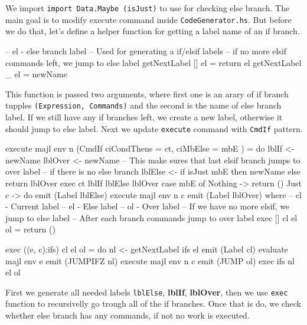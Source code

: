 \documentclass{article}
\begin{document}
\begin{flushleft}
We import \texttt{import Data.Maybe (isJust)} to use for checking else branch. The main goal is to modify execute command inside \texttt{CodeGenerator.hs}. But before we do that, let's define a helper function for getting a label name of an if branch.
\end{flushleft}
\begin{code}
-- el - else branch label
-- Used for generating a if/elsif labels
-- if no more elsif commands left, we jump to else label
getNextLabel [] el = return el
getNextLabel _  el = newName
\end{code}
\begin{flushleft}
This function is passed two arguments, where first one is an arary of if branch tupples \texttt{(Expression, Commands)} and the second is the name of else branch label. If we still have any if branches left, we create a new label, otherwise it should jump to else label. Next we update \texttt{execute} command with \texttt{CmdIf} pattern.
\end{flushleft}
\begin{code}
execute majl env n (CmdIf {ciCondThens = ct, ciMbElse = mbE }) = do
    lblIf <- newName
    lblOver <- newName
    -- This make sures that last elsif branch jumps to over label
    -- if there is no else branch
    lblElse <- if isJust mbE then newName else return lblOver
    exec ct lblIf lblElse lblOver
    case mbE of
        Nothing -> return ()
        Just c -> do
            emit (Label lblElse)
            execute majl env n c
    emit (Label lblOver)
    where
        -- cl - Current label
        -- el - Else label
        -- ol - Over label
        -- If we have no more elsif, we jump to else label
        -- After each branch commands jump to over label
        exec [] cl el ol = return ()

        exec ((e, c):ifs) cl el ol = do
        nl <- getNextLabel ifs el
        emit (Label cl)
        evaluate majl env e
        emit (JUMPIFZ nl)
        execute majl env n c
        emit (JUMP ol)
        exec ifs nl el ol
\end{code}
\begin{flushleft}
First we generate all needed labels \texttt{lblElse}, \textbf{lblIf}, \textbf{lblOver}, then we use \texttt{exec} function to recursivelly go trough all of the if branches. Once that is do, we check whether else branch has any commands, if not no work is executed.
\end{flushleft}
\end{document}
